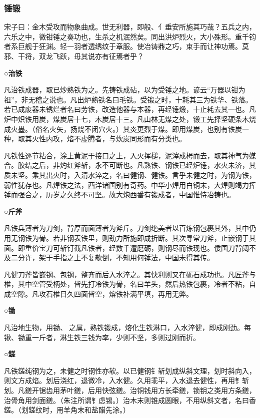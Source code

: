 \documentclass[]{article}
\begin{document}
\hypertarget{header-n2554}{%
\subsubsection{锤锻}\label{header-n2554}}

宋子曰：金木受攻而物象曲成。世无利器，即般、亻垂安所施其巧哉？五兵之内，六乐之中，微钳锤之奏功也，生杀之机泯然矣。同出洪炉烈火，大小殊形。重千钧者系巨舰于狂渊。轻一羽者透绣纹于章服。使冶铸鼎之巧，束手而让神功焉。莫邪、干将，双龙飞跃，毋其说亦有征焉者乎？

\textbf{○治铁}

凡治铁成器，取已炒熟铁为之。先铸铁成砧，以为受锤之地。谚云``万器以钳为祖''，非无稽之说也。凡出炉熟铁名曰毛铁。受锻之时，十耗其三为铁华、铁落。若已成废器未锈烂者名曰劳铁，改造他器与本器，再经锤煅，十止耗去其一也。凡炉中炽铁用炭，煤炭居十七，木炭居十三。凡山林无煤之处，锻工先择坚硬条木烧成火墨。（俗名火矢，扬烧不闭穴火。）其炎更烈于煤。即用煤炭，也别有铁炭一种，取其火性内攻，焰不虚腾者，与炊炭同形而有分类也。

凡铁性逐节粘合，涂上黄泥于接口之上，入火挥槌，泥滓成枵而去，取其神气为媒合。胶结之后，非灼红斧斩，永不可断也。凡熟铁、钢铁已经炉锤，水火未济，其质未坚。乘其出火时，入清水淬之，名曰健钢、健铁。言乎未健之时，为钢为铁，弱性犹存也。凡焊铁之法，西洋诸国别有奇药。中华小焊用白铜末，大焊则竭力挥锤而强合之，历岁之久终不可坚。故大炮西番有锻成者，中国惟恃冶铸也。

\textbf{○斤斧}

凡铁兵薄者为刀剑，背厚而面薄者为斧斤。刀剑绝美者以百炼钢包裹其外，其中仍用无钢铁为骨。若非钢表铁里，则劲力所施即成折断。其次寻常刀斧，止嵌钢于其面。即重价宝刀可斩钉截凡铁者，经数千遭磨砺，则钢尽而铁现也。倭国刀背阔不及二分许，架于手指之上不复欹倒，不知用何锤法，中国未得其传。

凡健刀斧皆嵌钢、包钢，整齐而后入水淬之。其快利则又在砺石成功也。凡匠斧与椎，其中空管受柄处，皆先打冷铁为骨，名曰羊头，然后热铁包裹，冷者不粘，自成空隙。凡攻石椎日久四面皆空，熔铁补满平填，再用无弊。

\textbf{○锄}

凡治地生物，用锄、之属，熟铁锻成，熔化生铁淋口，入水淬健，即成刚劲。每锹、锄重一斤者，淋生铁三钱为率，少则不坚，多则过刚而折。

\textbf{○鎈}

凡铁鎈纯钢为之，未健之时钢性亦软。以已健钢钅斩划成纵斜文理，划时斜向入，则文方成焰。划后浇红，退微冷，入水健。久用乖平，入水退去健性，再用钅斩划。凡鎈开锯齿用茅叶鎈，后用快弦鎈。治铜钱用方长牵鎈，锁钥之类用方条鎈，治骨角用剑面鎈。（朱注所谓钅虑锡。）治木末则锥成圆眼，不用纵斜文者，名曰香鎈。（划鎈纹时，用羊角末和盐醋先涂。）
\end{document}

